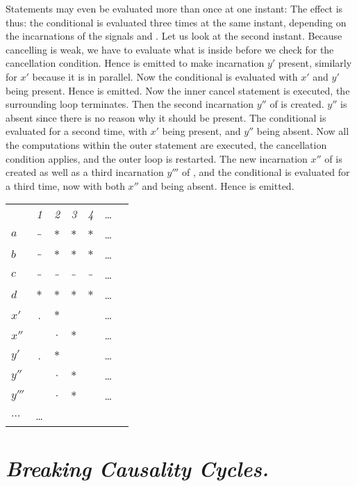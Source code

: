 Statements may even be evaluated more than once at one instant:
%
%
The effect is thus: the conditional is evaluated three times at the same
instant, depending on the incarnations of the signals  and .
Let us look at the second instant. Because cancelling is weak, we have to evaluate what is inside before we check for the cancellation condition. 
Hence  is emitted to make incarnation $y'$ present, similarly for 
$x'$ because it is in parallel. Now the conditional is evaluated with 
$x'$ and $y'$ being present. Hence  is emitted. 
Now the inner cancel statement is executed, the surrounding loop terminates. Then the second incarnation $y''$ of  is created. $y''$ is absent since 
there is no reason why it should be present. The conditional is evaluated for a second time, with $x'$ being present, and $y''$ being absent. Now all the computations within the outer  statement are executed, the cancellation condition applies, and the outer loop is restarted. The new 
incarnation $x''$ of  is created as well as a third incarnation $y'''$ of , and the conditional is evaluated
for a third time, now with both $x''$ and  being absent. Hence  is emitted.
\begin{center}
  \leavevmode
  \begin{tabular}[]{l@{\quad}||@{\quad} cccccc}
    \hline\hline
     &{\footnotesize \textit{1}}&{\footnotesize \textit{2}}
     &{\footnotesize \textit{3}}&{\footnotesize \textit{4}}&\ldots
   \\  
    \hbox{$a$} &$\_$&$*$&$*$&$*$&\ldots
   \\ 
   \hbox{$b$} &$\_$&$*$&$*$&$*$&\ldots
   \\
   \hbox{$c$} &$\_$&$\_$&$\_$&$\_$&\ldots
   \\
   \hbox{$d$} &$*$&$*$&$*$&$*$&\ldots
   \\   
   \hbox{$x'$} &.&$*$&&&\ldots
   \\
   \hbox{$x''$} &&$.$&$*$&&\ldots
   \\
   \hbox{$y'$} &.&$*$&&&\ldots
   \\
   \hbox{$y''$} &&$.$&$*$&&\ldots
   \\
   \hbox{$y'''$} &&$.$&$*$&&\ldots
   \\   \hbox{$\ldots$} &\ldots   
   \\   \hline\hline
  \end{tabular}
\end{center}


\section{\textit{Breaking Causality Cycles.}}

